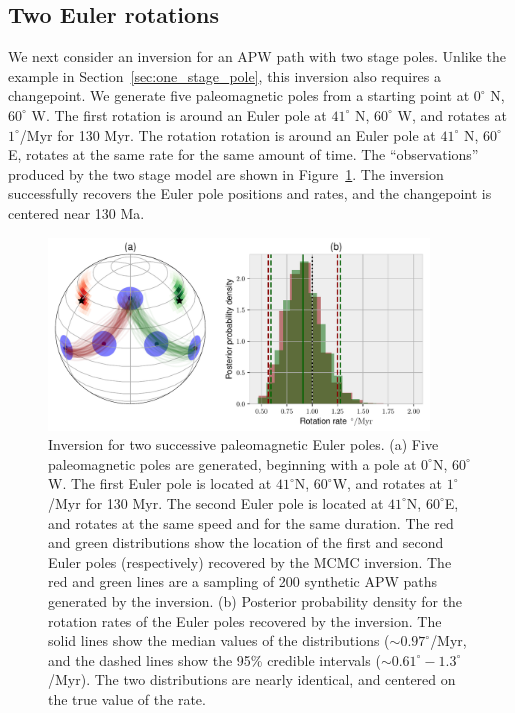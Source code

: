 \documentclass[preprint,12pt,authoryear]{elsarticle}
\begin{document}
\subsection{Two Euler rotations}
\label{sec:two_stage_poles}
We next consider an inversion for an APW path with two stage poles.
Unlike the example in Section~\ref{sec:one_stage_pole}, this inversion also requires a changepoint.
We generate five paleomagnetic poles from a starting point at $0^\circ$ N, $60^\circ$ W.
The first rotation is around an Euler pole at $41^\circ$ N, $60^\circ$ W, and rotates at $1^\circ$/Myr for 130 Myr.
The rotation rotation is around an Euler pole at $41^\circ$ N, $60^\circ$ E, rotates at the same rate for the same amount of time.
The ``observations'' produced by the two stage model are shown in Figure~\ref{fig:two_euler_poles}.
The inversion successfully recovers the Euler pole positions and rates, and the changepoint is centered near 130 Ma.
\begin{figure}
\includegraphics[width=0.9\textwidth]{figures/synthetic/two_euler_poles.pdf}
\caption[Inversion for two successive paleomagnetic Euler poles.]{Inversion for two successive paleomagnetic Euler poles. (a) Five paleomagnetic poles are generated, beginning with a pole at $0^\circ$N, $60^\circ$W. The first Euler pole is located at $41^\circ$N, $60^\circ$W, and rotates at $1^\circ$/Myr for 130 Myr. The second Euler pole is located at $41^\circ$N, $60^\circ$E, and rotates at the same speed and for the same duration. The red and green distributions show the location of the first and second Euler poles (respectively) recovered by the MCMC inversion. The red and green lines are a sampling of 200 synthetic APW paths generated by the inversion. (b) Posterior probability density for the rotation rates of the Euler poles recovered by the inversion. The solid lines show the median values of the distributions ($\sim 0.97^\circ$/Myr, and the dashed lines show the 95\% credible intervals ($\sim 0.61^\circ-1.3^\circ$/Myr). The two distributions are nearly identical, and centered on the true value of the rate.}
\label{fig:two_euler_poles}
\end{figure}
\end{document}

